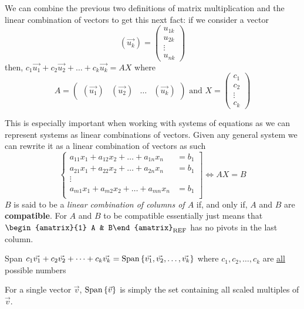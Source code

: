 We can combine the previous two definitions of matrix multiplication and the linear combination of vectors to get this next fact: if we consider a vector 
\[(\vec{u_k}) = \begin{pmatrix} u_{1k} \\ u_{2k} \\ \vdots \\ u_{nk} \end{pmatrix}\]
then, $c_1\vec{u_1} + c_2\vec{u_2} + \dots + c_k\vec{u_k} = AX$ where
\[
    A = 
    \begin{pmatrix}
        \left(\vec{u_1}\right) & \left(\vec{u_2}\right) & \dots & \left(\vec{u_k}\right)
    \end{pmatrix}
    \text{ and }
    X = \begin{pmatrix}
        c_1 \\ c_2 \\ \vdots \\ c_k
    \end{pmatrix}
\]

This is especially important when working with systems of equations as we can represent systems as linear combinations of vectors. Given any general system we can rewrite it as a linear combination of vectors as such
\[ 
    \left.\begin{cases}
        a_{11}x_1 + a_{12}x_2 + \dots + a_{1n}x_n &= b_1 \\
        a_{21}x_1 + a_{22}x_2 + \dots + a_{2n}x_n &= b_1 \\
        \vdots & \\
        a_{m1}x_1 + a_{m2}x_2 + \dots + a_{mn}x_n &= b_1 \\
    \end{cases}\right] \Leftrightarrow AX = B
\]
$B$ is said to be a \textit{linear combination of columns of $A$} if, and only if, $A$ and $B$ are \textbf{compatible}. For $A$ and $B$ to be compatible essentially just means that $\begin{amatrix}{1} A & B\end{amatrix}_{\text{REF}}$ has no pivots in the last column.

\begin{defbox}{Span}{}
    $c_1\vec{v_1} + c_2\vec{v_2} + \dots + c_k\vec{v_k} = \text{Span}\left\{\vec{v_1}, \vec{v_2}, \dots, \vec{v_k} \right\}$ where $c_1, c_2, \dots, c_k$ are \underline{all} possible numbers
\end{defbox}

For a single vector $\vec{v}$, $\text{Span}\left\{\vec{v} \right\}$ is simply the set containing all scaled multiples of $\vec{v}$.

